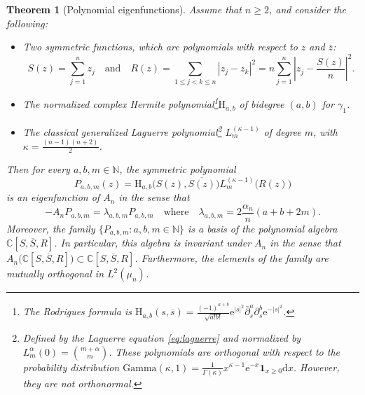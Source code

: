 \documentclass[11pt,reqno]{amsart}
\numberwithin{equation}{section}%
\numberwithin{figure}{section}%
\numberwithin{table}{section}
\theoremstyle{plain}
\newtheorem{theorem}{Theorem}[section]
\theoremstyle{definition}
\begin{document}
\begin{theorem}[Polynomial eigenfunctions]\label{th:poly}
  Assume that $n\geq2$, and consider the following:
  \begin{itemize}
  \item Two symmetric functions, which are polynomials with respect to $z$ and $\bar{z}$:
    \begin{equation}\label{eq:S-R}
      S(z)=\sum_{j=1}^n z_j
      \quad\text{and}\quad
      R(z)=\sum_{1\leq j<k\leq n}|z_j-z_k|^2=n\sum_{j=1}^n\left|z_j-\frac{S(z)}n\right|^2.
    \end{equation}
  \item The normalized complex Hermite polynomial\footnote{The Rodrigues
      formula is
      $\mathrm H_{a,b}(s,\overline
      s)=\frac{(-1)^{a+b}}{\sqrt{a!b!}}\mathrm{e}^{|s|^2}\bar\partial_s^{a}\partial_s^{b}\mathrm{e}^{-|s|^2}$.}$\mathrm
    H_{a,b}$ of bidegree $(a,b)$ for $\gamma_1$.
  \item The classical generalized Laguerre polynomial\footnote{Defined by the
      Laguerre equation \eqref{eq:laguerre} and normalized by
      $L^{\alpha}_m(0)=\binom{m+\alpha}{m}$. These polynomials are orthogonal
      with respect to the probability distribution
      $\mathrm{Gamma}(\kappa,1)=\frac{1}{\Gamma(\kappa)}x^{\kappa-1}\mathrm{e}^{-x}\mathbf{1}_{x\geq0}\mathrm{d}x$.
      However, they are not orthonormal.} $L_m^{(\kappa-1)}$ of degree $m$,
    with $\kappa=\frac{(n-1)(n+2)}{2}$.
  \end{itemize}
  Then for every $a,b,m\in\mathbb N$, the symmetric polynomial
  \begin{equation}\label{eq:eigenpolynomial}
    P_{a,b,m}(z)
    =\mathrm H_{a,b}\bigl(S(z),\overline{S(z)}\bigr)
    L_m^{(\kappa-1)}\bigl(R(z)\bigr)
  \end{equation}
  is an eigenfunction of $A_n$ in the sense that
  \begin{equation}\label{eq:eigenvalue}
    -A_nP_{a,b,m}  =\lambda_{a,b,m}P_{a,b,m}
    \quad\text{where}\quad
    \lambda_{a,b,m}=2\frac{\alpha_n}{n}(a+b+2m).
  \end{equation}
  Moreover, the family $\{P_{a,b,m}:a,b,m\in\mathbb{N}\}$ is a basis of the
  polynomial algebra $\mathbb C[S,\overline S,R]$. In particular, this algebra
  is invariant under $A_n$ in the sense that
  $A_n\bigl(\mathbb C[S,\overline S,R]\bigr)\subset\mathbb C[S,\overline
  S,R]$. Furthermore, the elements of the family are mutually orthogonal in
  $L^2(\mu_n)$.
\end{theorem}
\end{document}
